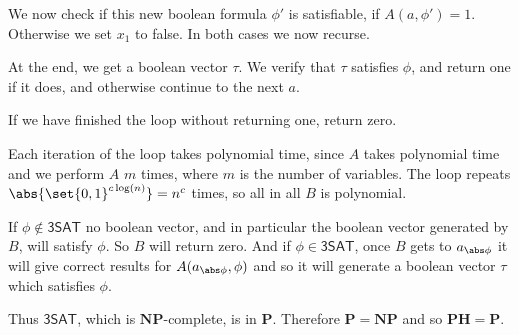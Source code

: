 \documentclass[10pt]{article}
\def\threesat{\mathsf{3SAT}}
\def\PH{\mathbf{PH}}
\def\P{\mathbf{P}}
\def\NP{\mathbf{NP}}
\begin{document}
    We now check if this new boolean formula $\phi'$ is satisfiable, if $A(a,\phi')=1$.
    Otherwise we set $x_1$ to false.
    In both cases we now recurse.
    \item At the end, we get a boolean vector $\tau$.
    We verify that $\tau$ satisfies $\phi$, and return one if it does, and otherwise continue to the next $a$.
    \item If we have finished the loop without returning one, return zero.
\eenum

Each iteration of the loop takes polynomial time, since $A$ takes polynomial time and we perform $A$ $m$ times, where $m$ is the number of variables.
The loop repeats $\abs{\set{0,1}^{c\log(n)}}=n^c$ times, so all in all $B$ is polynomial.

If $\phi\notin\threesat$ no boolean vector, and in particular the boolean vector generated by $B$, will satisfy $\phi$.
So $B$ will return zero.
And if $\phi\in\threesat$, once $B$ gets to $a_{\abs\phi}$ it will give correct results for $A(a_{\abs\phi},\phi)$ and so it will generate a boolean vector $\tau$ which satisfies $\phi$.

Thus $\threesat$, which is $\NP$-complete, is in $\P$.
Therefore $\P=\NP$ and so $\PH=\P$.
\end{document}
